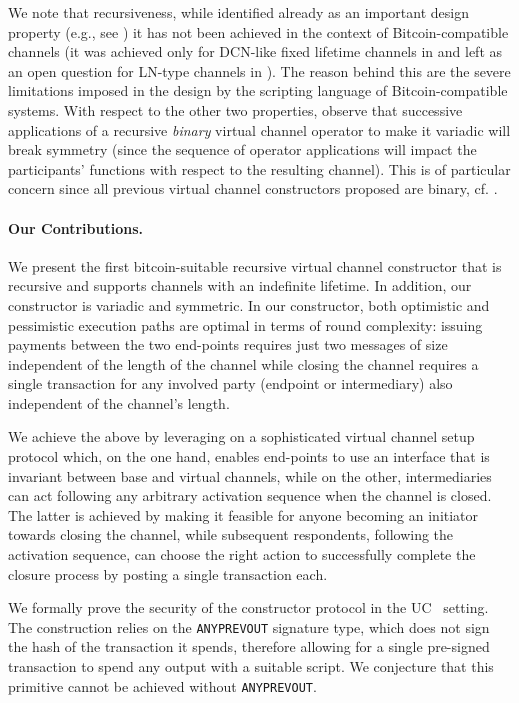 We note that recursiveness, while identified already as an important design property (e.g., see \cite{DBLP:conf/ccs/DziembowskiFH18}) it has not been achieved in the context of Bitcoin-compatible channels 
(it was achieved only for DCN-like fixed lifetime channels in \cite{cans20} and left as an open question for LN-type channels in \cite{cryptoeprint:2020:554}). 
The reason behind this are the severe limitations imposed in the design by the scripting language of Bitcoin-compatible systems. 
%
With respect to the other two properties, observe that successive applications of a recursive {\em binary} virtual channel operator to make it variadic will break symmetry (since the sequence of operator applications will impact the participants' functions with respect to the resulting channel). This is of particular concern since all previous virtual channel constructors proposed are binary, cf. \cite{DBLP:conf/ccs/DziembowskiFH18,cryptoeprint:2020:554,cans20}. 

\paragraph{Our Contributions.}  We present  the first  bitcoin-suitable recursive virtual channel constructor that is recursive and supports channels with an indefinite lifetime. In addition, our constructor is variadic and symmetric. In our constructor, both optimistic and pessimistic execution paths are optimal in terms of round complexity: issuing payments between the two end-points requires just two messages of size independent of the length of the channel while
closing the channel requires a single transaction for any involved party (endpoint or intermediary) also independent of the channel's length. 

We achieve the above by leveraging on a sophisticated virtual channel setup protocol which, on the one hand, enables end-points to use an interface that is invariant between base and virtual channels, 
while on the other, intermediaries can act following any arbitrary activation sequence when the channel is closed. The latter is achieved by making it feasible for anyone becoming an initiator towards closing the channel, while subsequent respondents, following the activation sequence, can choose the right action to successfully complete the closure process by posting a single transaction each. 

  We formally prove the security of the constructor protocol in the  UC~\cite{uc} setting. The construction relies on the \texttt{ANYPREVOUT}   signature type, which does not sign the hash of the transaction it spends, therefore allowing for a single pre-signed transaction to spend any output
  with a suitable script. We conjecture that this primitive cannot be achieved without \texttt{ANYPREVOUT}. 
 
